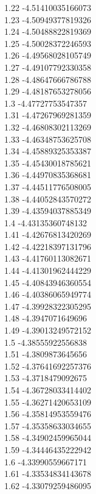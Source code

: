 {1.22	-4.51410035166073\\
1.23	-4.50949377819326\\
1.24	-4.50488822819369\\
1.25	-4.50028372246593\\
1.26	-4.49568028105749\\
1.27	-4.49107792330358\\
1.28	-4.48647666786788\\
1.29	-4.48187653278056\\
1.3	-4.47727753547357\\
1.31	-4.47267969281359\\
1.32	-4.46808302113269\\
1.33	-4.46348753625708\\
1.34	-4.45889325353387\\
1.35	-4.45430018785621\\
1.36	-4.44970835368681\\
1.37	-4.44511776508005\\
1.38	-4.44052843570272\\
1.39	-4.43594037885349\\
1.4	-4.43135360748132\\
1.41	-4.42676813420269\\
1.42	-4.42218397131796\\
1.43	-4.41760113082671\\
1.44	-4.41301962444229\\
1.45	-4.40843946360554\\
1.46	-4.40386065949774\\
1.47	-4.39928322305295\\
1.48	-4.3947071649696\\
1.49	-4.39013249572152\\
1.5	-4.38555922556838\\
1.51	-4.3809873645656\\
1.52	-4.37641692257376\\
1.53	-4.3718479092675\\
1.54	-4.36728033414402\\
1.55	-4.36271420653109\\
1.56	-4.35814953559476\\
1.57	-4.35358633034655\\
1.58	-4.34902459965044\\
1.59	-4.34446435222942\\
1.6	-4.33990559667171\\
1.61	-4.33534834143678\\
1.62	-4.33079259486095\\
}
